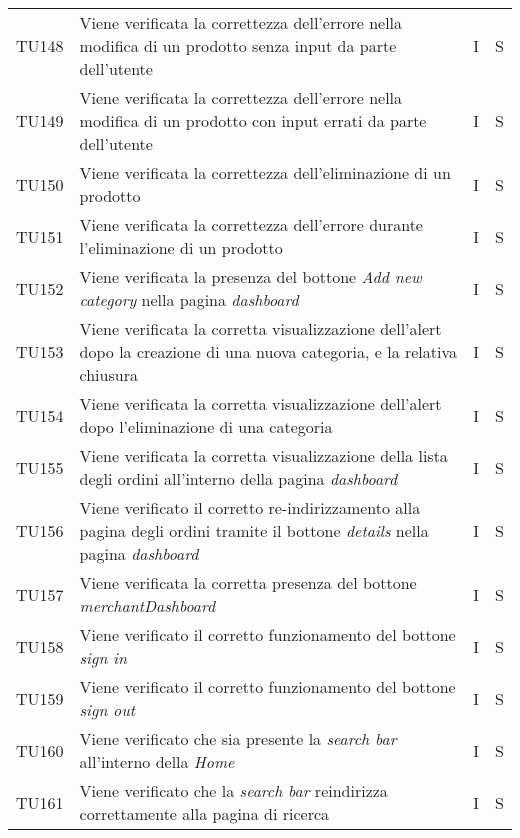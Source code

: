 {\begin{longtable}{C{2cm} C{9.6cm} C{1.5cm} C{1cm}}
TU148 & Viene verificata la correttezza dell'errore nella modifica di un prodotto senza input da parte dell'utente & I & S\\

TU149 & Viene verificata la correttezza dell'errore nella modifica di un prodotto con input errati da parte dell'utente & I & S\\

TU150 & Viene verificata la correttezza dell'eliminazione di un prodotto & I & S\\

TU151 & Viene verificata la correttezza dell'errore durante l'eliminazione di un prodotto & I & S\\

TU152 & Viene verificata la presenza del bottone \textit{Add new category} nella pagina \textit{dashboard} & I & S\\

TU153 & Viene verificata la corretta visualizzazione dell'alert dopo la creazione di una nuova categoria, e la relativa chiusura & I & S\\

TU154 & Viene verificata la corretta visualizzazione dell'alert dopo l'eliminazione di una categoria & I & S\\

TU155 & Viene verificata la corretta visualizzazione della lista degli ordini all'interno della pagina \textit{dashboard} & I & S\\

TU156 & Viene verificato il corretto re-indirizzamento alla pagina degli ordini tramite il bottone \textit{details} nella pagina \textit{dashboard} & I & S\\

TU157 & Viene verificata la corretta presenza del bottone \textit{merchantDashboard} & I & S\\

TU158 & Viene verificato il corretto funzionamento del bottone \textit{sign in} & I & S\\

TU159 & Viene verificato il corretto funzionamento del bottone \textit{sign out} & I & S\\

TU160 & Viene verificato che sia presente la \textit{search bar} all'interno della \textit{Home} & I & S\\

TU161 & Viene verificato che la \textit{search bar} reindirizza correttamente alla pagina di ricerca & I & S\\


\end{longtable}}
